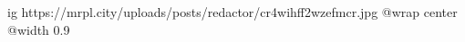  
 
 
 
 

\ifcmt
  ig https://mrpl.city/uploads/posts/redactor/cr4wihff2wzefmcr.jpg
  @wrap center
  @width 0.9
\fi
